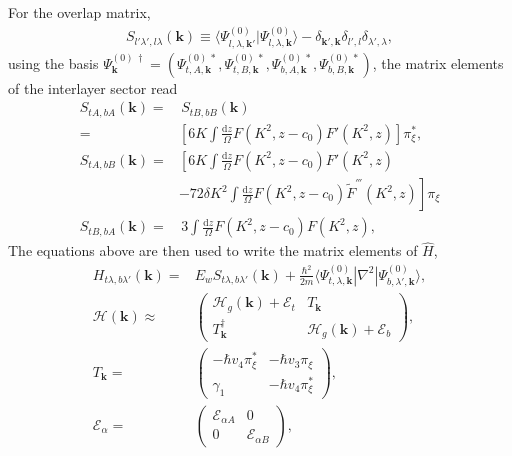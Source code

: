 \documentclass[showpacs,aps,prb,reprint,twocolumn]{revtex4-1}
\begin{document}
For the overlap matrix,
\begin{align} \label{eq:Overlap_BLG}
S_{l'\lambda',l\lambda}(\boldsymbol{k}) \equiv 
\langle \Psi_{l,\lambda,\boldsymbol{k}'}^{(0)}|\Psi_{l,\lambda,\boldsymbol{k}}^{(0)}\rangle - \delta_{\boldsymbol{k}',\boldsymbol{k}} \delta_{l',l}\delta_{\lambda',\lambda},
\end{align}
using the basis $\Psi^{(0)\,\dagger}_{\boldsymbol{k}} = \left(
\Psi^{(0)\,*}_{t,A,\boldsymbol{k}},
\Psi^{(0)\,*}_{t,B,\boldsymbol{k}},
\Psi^{(0)\,*}_{b,A,\boldsymbol{k}},
\Psi^{(0)\,*}_{b,B,\boldsymbol{k}}\right)$, the matrix elements of the interlayer sector read
\begin{subequations}
\begin{align}
S_{tA,bA}(\boldsymbol{k})=&\,
S_{tB,bB}(\boldsymbol{k})\\
=& \left[
6K\int \frac{\mathrm{d}z}{\Omega} F(K^2,z-c_0) F'(K^2,z)
\right]\pi^*_\xi,\nonumber\\
S_{tA,bB}(\boldsymbol{k})=& 
\left[
6K\int \frac{\mathrm{d}z}{\Omega} F(K^2,z-c_0) F'(K^2,z)\right.\\
&\left. - 72\delta K^2 \int \frac{\mathrm{d}z}{\Omega} F(K^2,z-c_0) \tilde{F}^{'''}(K^2,z)
\right]\pi_\xi\nonumber\\
S_{tB,bA}(\boldsymbol{k})=&\, 3\int \frac{\mathrm{d}z}{\Omega} 
F(K^2,z-c_0) F(K^2,z),
\end{align}
\end{subequations}
The equations above are then used to write the matrix elements of $\hat{H}$,
\begin{align}\label{eq:Ham_Bernal_BLG}
H_{t\lambda,b\lambda'}(\boldsymbol{k})=&
E_w S_{t\lambda,b\lambda'}(\boldsymbol{k}) + \frac{\hbar^2}{2m} \langle \Psi_{t,\lambda,\boldsymbol{k}}^{(0)}|\nabla^2|\Psi_{b,\lambda',\boldsymbol{k}}^{(0)}\rangle,\nonumber\\
\mathcal{H}(\boldsymbol{k}) \approx &
\begin{pmatrix}
\mathcal{H}_g(\boldsymbol{k})+\mathcal{E}_t&
T_{\boldsymbol{k}}\\
T_{\boldsymbol{k}}^\dagger&
\mathcal{H}_g(\boldsymbol{k})+\mathcal{E}_b
\end{pmatrix},\\ 
T_{\boldsymbol{k}}=&
\left(
\begin{matrix}
-\hbar v_4 \pi^*_\xi & -\hbar v_3 \pi_\xi \\
\gamma_1 & -\hbar v_4 \pi_\xi^*
\end{matrix}
\right), \nonumber\\
\mathcal{E}_\alpha=&
\left(
\begin{matrix}
\mathcal{E}_{\alpha A}&0\\
0&
\mathcal{E}_{\alpha B}
\end{matrix}
\right),\nonumber
\end{align}
\end{document}
